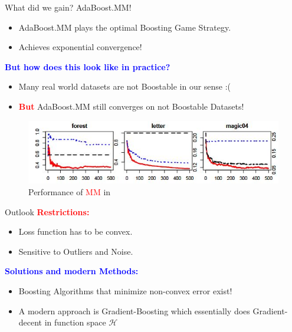 \documentclass{beamer}
\begin{document}
\begin{frame}{What did we gain? AdaBoost.MM!}
    \begin{itemize}
        \item AdaBoost.MM plays the optimal Boosting Game Strategy.
        \item Achieves exponential convergence!
    \end{itemize}
    \bigbreak
    \textbf{\textcolor{blue}{But how does this look like in practice?}} \\
    \begin{itemize}
        \item Many real world datasets are not Boostable in our sense :(
        \item \textbf{\textcolor{red}{But}} AdaBoost.MM still converges on not Boostable Datasets!
    \end{itemize}
    \bigbreak
    \begin{center}
        \begin{figure}
            \centering
            \includegraphics[width=0.8\linewidth]{images/MMperformance.JPG}
            \caption{\small Performance of \textcolor{red}{MM} in \cite{mukherjee2011theory}}
            \label{fig:Performance}
        \end{figure}
    \end{center}
    \begin{figure}

    \end{figure}
\end{frame}

\begin{frame}{Outlook}
    \textbf{\textcolor{red}{Restrictions:}}
    \begin{itemize}
        \item Loss function has to be convex.
        \item Sensitive to Outliers and Noise.
    \end{itemize}
    \bigbreak
    \textbf{\textcolor{blue}{Solutions and modern Methods:}}
    \begin{itemize}
        \item Boosting Algorithms that minimize non-convex error \cite{pfetsch2020ipboost} exist!
        \item A modern approach is Gradient-Boosting which essentially does Gradient-decent in function space $\mathcal{H}$
    \end{itemize}

\end{frame}
\end{document}

